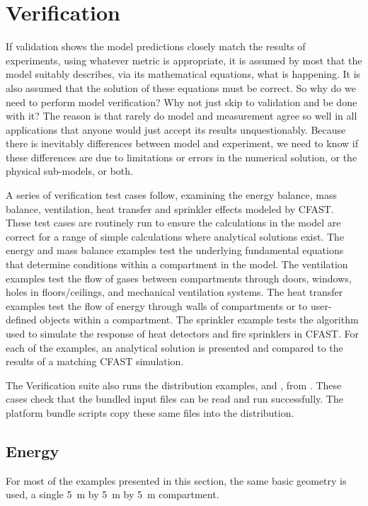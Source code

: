 
\chapter{Verification}
\label{Verification_Chapter}

If validation shows the model predictions closely match the results of experiments, using whatever metric is appropriate, it is assumed by most that the model suitably describes, via its mathematical equations, what is happening. It is also assumed that the solution of these equations must be correct. So why do we need to perform model verification? Why not just skip to validation and be done with it? The reason is that rarely do model and measurement agree so well in all applications that anyone would just accept its results unquestionably. Because there is inevitably differences between model and experiment, we need to know if these differences are due to limitations or errors in the numerical solution, or the physical sub-models, or both.

A series of verification test cases follow, examining the energy balance, mass balance, ventilation, heat transfer and sprinkler effects modeled by CFAST. These test cases are routinely run to ensure the calculations in the model are correct for a range of simple calculations where analytical solutions exist. The energy and mass balance examples test the underlying fundamental equations that determine conditions within a compartment in the model. The ventilation examples test the flow of gases between compartments through doors, windows, holes in floors/ceilings, and mechanical ventilation systems.  The heat transfer examples test the flow of energy through walls of compartments or to user-defined objects within a compartment. The sprinkler example tests the algorithm used to simulate the response of heat detectors and fire sprinklers in CFAST.  For each of the examples, an analytical solution is presented and compared to the results of a matching CFAST simulation.

The Verification suite also runs the distribution examples,  and , from . These cases check that the bundled input files can be read and run successfully. The platform bundle scripts copy these same files into the distribution.

\section{Energy}
\label{energy_balance}
For most of the examples presented in this section, the same basic geometry is used, a single 5~m by 5~m by 5~m compartment.

